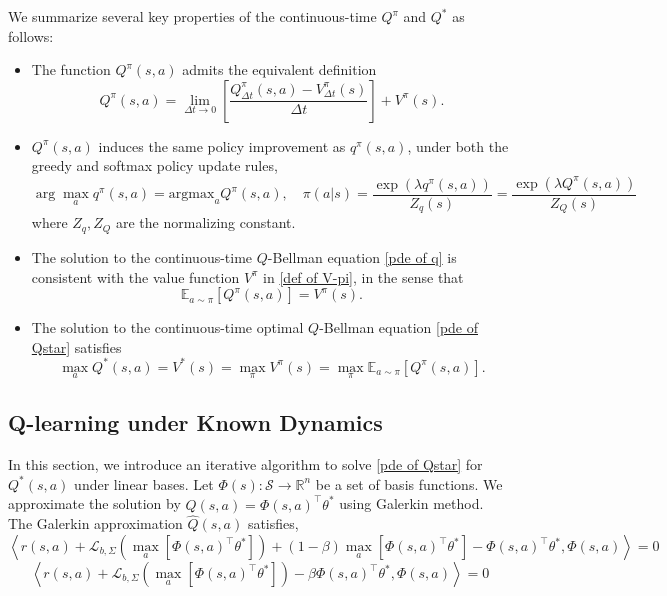 \documentclass[12pt]{article}
\def\th{\theta}
\def\th{\theta}
\def\E{\mathbb E}
\def\mL{\mathcal{L}_{b,\Sigma}}
\def\l{\left}
\def\r{\right}
\def\la{\left\langle}
\def\ra{\right\rangle}
\def\argmax{\text{argmax}}
\begin{document}
We summarize several key properties of the continuous-time $Q^\pi$ and $Q^*$ as follows:
\begin{itemize}

\item The function $Q^\pi(s,a)$ admits the equivalent definition
\[
Q^\pi(s,a) = \lim_{\Delta t \to 0} \left[\frac{Q^\pi_{\Delta t}(s,a) - V^\pi_{\Delta t}(s)}{\Delta t}\right] + V^\pi(s).
\]

\item $Q^\pi(s,a)$ induces the same policy improvement as $q^\pi(s,a)$, under both the greedy and softmax policy update rules,
\[
\arg\max_a q^\pi(s,a) = \argmax_a Q^\pi(s,a), \quad \pi(a|s) = \frac{\exp( \lambda q^\pi(s,a))}{Z_q(s)} = \frac{\exp( \lambda Q^\pi(s,a)) }{Z_Q(s)}
\]
where $Z_q, Z_Q$ are the normalizing constant.
\item The solution to the continuous-time $Q$-Bellman equation \eqref{pde of q} is consistent with the value function $V^\pi$ in \eqref{def of V-pi}, in the sense that
\[
\E_{a \sim \pi}[Q^\pi(s,a)] = V^\pi(s).
\]

\item The solution to the continuous-time optimal $Q$-Bellman equation \eqref{pde of Qstar} satisfies
\[
\max_{a} Q^*(s,a) = V^*(s) = \max_{\pi} V^\pi(s) = \max_{\pi} \E_{a \sim \pi}[Q^\pi(s,a)].
\]

\end{itemize}



\subsection{Q-learning under Known Dynamics}\label{sec:off-policy-known}
In this section, we introduce an iterative algorithm to solve  \eqref{pde of Qstar} for $Q^*(s,a)$ under linear bases. Let $\Phi(s): \mathcal{S} \to \mathbb{R}^n$ be a set of basis functions. We approximate the solution by $\hat{Q}(s,a) = \Phi(s,a)^\top \th^*$ using Galerkin method. The Galerkin approximation $\hat{Q}(s,a)$ satisfies, 
\begin{equation}\label{galerkin-solu}
    \la r(s,a) + \mL \l(\max_a \l[\Phi(s,a)^\top\th^*\r]\r) + (1-\beta) \max_a\l[\Phi(s,a)^\top\th^*\r] - \Phi(s,a)^\top\th^*,\Phi(s,a)\ra= 0
\end{equation}
\begin{equation}\label{galerkin-solu}
    \la r(s,a) + \mL \l(\max_a \l[\Phi(s,a)^\top\th^*\r]\r) -\beta \Phi(s,a)^\top\th^*,\Phi(s,a)\ra= 0
\end{equation}
\end{document}
